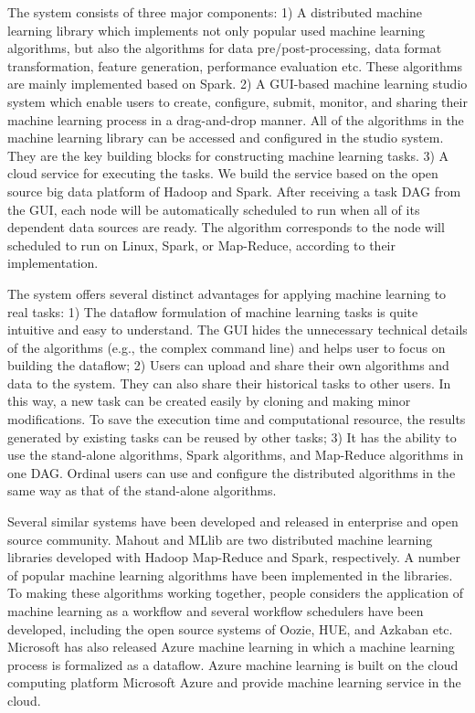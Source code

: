 \documentclass{sig-alternate-05-2015}
\begin{document}
The system consists of three major components: 1) A distributed machine learning library which implements not only popular used machine learning algorithms, but also the algorithms for data pre/post-processing, data format transformation, feature generation, performance evaluation etc. These algorithms are mainly implemented based on Spark.  2) A GUI-based machine learning studio system which enable users to create, configure, submit, monitor, and sharing their machine learning process in a drag-and-drop manner. All of the algorithms in the machine learning library can be accessed and configured in the studio system. They are the key building blocks for constructing machine learning tasks. 3) A cloud service for executing the tasks. We build the service based on the open source big data platform of Hadoop and Spark. After receiving a task DAG from the GUI, each node will be automatically scheduled to run when all of its dependent data sources are ready. The algorithm corresponds to the node will scheduled to run on Linux, Spark, or Map-Reduce\cite{dean2004mapreduce,dean2010mapreduce}, according to their implementation.

The system offers several distinct advantages for applying machine learning to real tasks: 1) The dataflow formulation of machine learning tasks is quite intuitive and easy to understand. The GUI hides the unnecessary technical details of the algorithms (e.g., the complex command line) and helps user to focus on building the dataflow; 2) Users can upload and share their own algorithms and data to the system. They can also share their historical tasks to other users. In this way, a new task can be created easily by cloning and making minor modifications. To save the execution time and computational resource, the results generated by existing tasks can be reused by other tasks; 3) It has the ability to use the stand-alone algorithms, Spark algorithms, and Map-Reduce algorithms in one DAG. Ordinal users can use and configure the distributed algorithms in the same way as that of the stand-alone algorithms.

Several similar systems have been developed and released in enterprise and open source community. Mahout and MLlib are two distributed machine learning libraries developed with Hadoop Map-Reduce and Spark, respectively. A number of popular machine learning algorithms have been implemented in the libraries. To making these algorithms working together, people considers the application of machine learning as a workflow and several workflow schedulers have been developed, including the open source systems of Oozie\cite{islam2012oozie}, HUE, and Azkaban etc. Microsoft has also released Azure machine learning\cite{barga2014introducing} in which a machine learning process is formalized as a dataflow. Azure machine learning is built on the cloud computing platform Microsoft Azure and provide machine learning service in the cloud.
\end{document}
